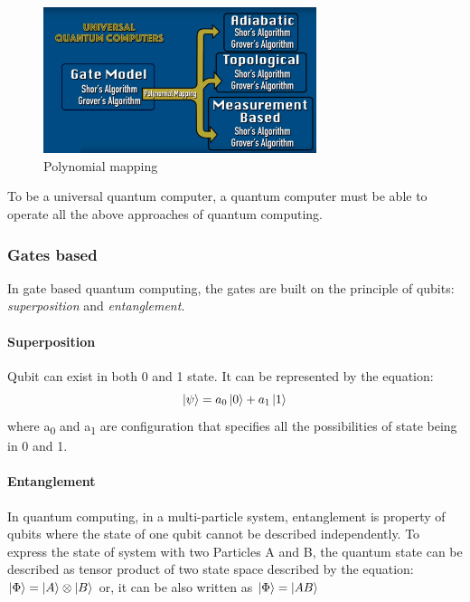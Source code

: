 \documentclass[12pt,conference]{IEEEtran}
\begin{document}
\begin{figure}[h]
  \centering
  \includegraphics[width=8cm]{uqc_mapping.jpg}
  \caption{Polynomial mapping}
  \label{fig:PolynomicalUQC}
\end{figure}

To be a universal quantum computer, a quantum computer must be able to operate all the above approaches of quantum computing.



\subsubsection{Gates based}
In gate based quantum computing, the gates are built on the principle of qubits: \emph{superposition} and \emph{entanglement}.

\paragraph{Superposition}
Qubit can exist in both 0 and 1 state. It can be represented by the equation:
\begin{equation*}
  \ket {\psi} = a_0 \ket{0} + a_1 \ket{1}
\end{equation*} 
where a\textsubscript{0} and a\textsubscript{1} are configuration that specifies all the possibilities of state being in 0 and 1.\cite{1}

\paragraph{Entanglement}
In quantum computing, in a multi-particle system, entanglement is property of qubits where the state of one qubit cannot be described independently. To express the state of system with two Particles A and B, the quantum state can be described as tensor product of two state space described by the equation:
$\ket {\Phi} = \ket{A} \otimes \ket{B}$
or, it can be also written as
$\ket {\Phi} = \ket{AB}$
\end{document}
